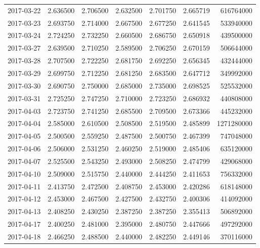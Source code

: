 \begin{tabular}{lrrrrrr}
2017-03-22 &    2.636500 &    2.706500 &    2.632500 &    2.701750 &    2.665719 &   616764000 \\
2017-03-23 &    2.693750 &    2.714000 &    2.667500 &    2.677250 &    2.641545 &   533940000 \\
2017-03-24 &    2.724250 &    2.732250 &    2.660500 &    2.686750 &    2.650918 &   439500000 \\
2017-03-27 &    2.639500 &    2.710250 &    2.589500 &    2.706250 &    2.670159 &   506644000 \\
2017-03-28 &    2.707500 &    2.722250 &    2.681750 &    2.692250 &    2.656345 &   432444000 \\
2017-03-29 &    2.699750 &    2.712250 &    2.681250 &    2.683500 &    2.647712 &   349992000 \\
2017-03-30 &    2.690750 &    2.750000 &    2.685000 &    2.735000 &    2.698525 &   525532000 \\
2017-03-31 &    2.725250 &    2.747250 &    2.710000 &    2.723250 &    2.686932 &   440808000 \\
2017-04-03 &    2.723750 &    2.741250 &    2.685500 &    2.709500 &    2.673366 &   445232000 \\
2017-04-04 &    2.585000 &    2.610500 &    2.508500 &    2.519500 &    2.485899 &  1271280000 \\
2017-04-05 &    2.500500 &    2.559250 &    2.487500 &    2.500750 &    2.467399 &   747048000 \\
2017-04-06 &    2.506000 &    2.531250 &    2.460250 &    2.519000 &    2.485406 &   635120000 \\
2017-04-07 &    2.525500 &    2.543250 &    2.493000 &    2.508250 &    2.474799 &   429068000 \\
2017-04-10 &    2.509000 &    2.515750 &    2.440000 &    2.444250 &    2.411653 &   756332000 \\
2017-04-11 &    2.413750 &    2.472500 &    2.408750 &    2.453000 &    2.420286 &   618148000 \\
2017-04-12 &    2.453000 &    2.467500 &    2.427500 &    2.432750 &    2.400306 &   414092000 \\
2017-04-13 &    2.408250 &    2.430250 &    2.387250 &    2.387250 &    2.355413 &   506892000 \\
2017-04-17 &    2.400250 &    2.481000 &    2.395000 &    2.480750 &    2.447666 &   497292000 \\
2017-04-18 &    2.466250 &    2.488500 &    2.440000 &    2.482250 &    2.449146 &   370116000 \\

\end{tabular}
